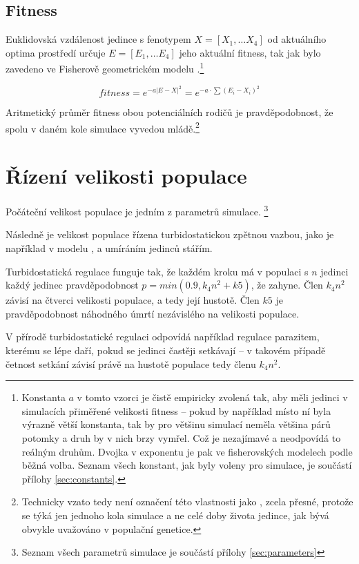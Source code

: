 \subsection{Fitness}

Euklidovská vzdálenost jedince s fenotypem $X = [X_1,\dots{}X_4]$ od aktuálního optima prostředí určuje
$E = [E_1,\dots{} E_4]$ jeho aktuální fitness, tak jak bylo zavedeno ve Fisherově geometrickém modelu
\citep{tenaillon2014utility}.\footnote{
Konstanta $a$ v tomto vzorci je čistě empiricky zvolená tak, aby měli jedinci v simulacích
přiměřené velikosti fitness -- pokud by například místo ní byla výrazně větší konstanta, tak by pro většinu simulací
neměla většina párů potomky a druh by v nich brzy vymřel. Což je nezajímavé a neodpovídá to reálným druhům.
Dvojka v exponentu je pak ve fisherovských modelech podle \citet{tenaillon2014utility} běžná volba.
Seznam všech konstant, jak byly voleny pro simulace, je součástí přílohy \ref{sec:constants}.
}

\begin{equation}
fitness = e^{-a |E-X|^2} = e^{-a\cdot{\sum{(E_i - X_i)^2}}}
\end{equation}

Aritmetický průměr fitness obou potenciálních rodičů je pravděpodobnost, že spolu v daném kole simulace vyvedou
mládě.\footnote{Technicky vzato tedy není označení této vlastnosti jako , zcela přesné, protože se týká
jen jednoho kola simulace a ne celé doby života jedince, jak bývá obvykle uvažováno v populační genetice.}

\section{Řízení velikosti populace}

Počáteční velikost populace je jedním z parametrů simulace.
\footnote{Seznam všech parametrů simulace je součástí přílohy \ref{sec:parameters}}

Následně je velikost populace řízena turbidostatickou
zpětnou vazbou, jako je například v modelu \citet{Flegr139030}, a umíráním jedinců stářím.

Turbidostatická regulace funguje tak, že každém kroku má v populaci s $n$ jedinci každý jedinec pravděpodobnost
$p = min(0.9, k_4 n^2 + k5)$, že zahyne. Člen $k_4 n^2$ závisí na čtverci velikosti populace, a tedy její hustotě.
Člen $k5$ je pravděpodobnost náhodného úmrtí nezávislého na velikosti populace.

V přírodě turbidostatické regulaci odpovídá například regulace parazitem, kterému se lépe daří,
pokud se jedinci častěji setkávají -- v takovém případě četnost setkání závisí právě na hustotě populace tedy členu
$k_4 n^2$.

